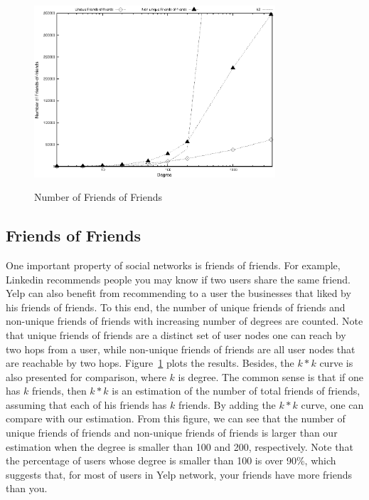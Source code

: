 \documentclass[11pt, oneside]{article}   	%
\begin{document}
\begin{figure}[t]
  \centering
  \caption{Number of Friends of Friends} 
       \includegraphics[width=0.8\textwidth]{figures/fof.eps}
  \label{fig:fof}
\end{figure}

\subsection{Friends of Friends}
One important property of social networks is friends of friends. For example, Linkedin recommends people you may know
if two users share the same friend. Yelp can also benefit from recommending to a user the businesses 
that liked by his friends of friends. To this end, the number of unique friends of friends and non-unique friends of friends with 
increasing number of degrees are counted. Note that unique friends of friends are a distinct set of user nodes one can 
reach by two hops from a user, while non-unique friends of friends are all user nodes that are reachable by two hops.  
Figure~\ref{fig:fof} plots the results. Besides, the $k*k$ curve is also presented for comparison, where $k$ is degree.  
The common sense is that if one has $k$ friends, then $k*k$ is an estimation of the number of total friends of friends, assuming
that each of his friends has $k$ friends. By adding the $k*k$ curve, one can compare with our estimation. From this 
figure, we can see that the number of unique friends of friends and non-unique friends of friends is larger than our 
estimation when the degree is smaller than 100 and 200, respectively. Note that the percentage of users whose 
degree is smaller than 100 is over 90\%, which suggests that, for most of users in Yelp network, your friends 
have more friends than you. 
\end{document}
